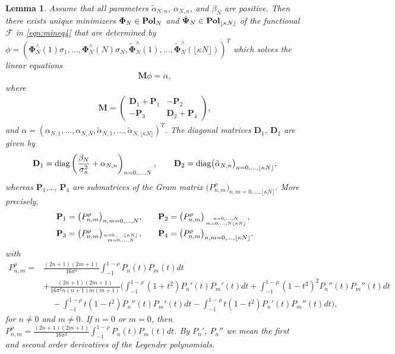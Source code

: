 \documentclass[a4paper, 10pt]{article}
\numberwithin{equation}{section}
\newtheorem{lem}[thm]{Lemma}
\theoremstyle{definition}
\begin{document}
\begin{lem}\label{prop:minsol4}
Assume that all parameters $\tilde{\alpha}_{N,n}$, $\alpha_{N,n}$, and $\beta_N$ are positive. Then there exists unique minimizers $\mathbf{\Phi}_N\in\textnormal{\textbf{Pol}}_{N}$ and $\tilde{\mathbf{\Psi}}_N\in\textnormal{\textbf{Pol}}_{\lfloor\kappa N\rfloor}$ of the functional $\mathcal{F}$ in \eqref{eqn:mineq4} that are determined by $\phi=(\mathbf{\Phi}_N^\wedge(1)\sigma_1,\ldots,\mathbf{\Phi}_N^\wedge(N)\sigma_{N},\tilde{\mathbf{\Phi}}_{N}^\wedge(1),\ldots,\tilde{\mathbf{\Phi}}_{N}^\wedge(\lfloor\kappa N\rfloor))^T$ which solves the linear equations
\begin{align}\label{eqn:lineq4}
\mathbf{M}{\phi}=\alpha,
\end{align}
where 
\begin{align}
\mathbf{M}=\left(\begin{array}{c|c}\mathbf{D}_1+\mathbf{P}_1&-\mathbf{P}_2\\\hline-\mathbf{P}_3&\mathbf{D}_2+\mathbf{P}_4\end{array}\right),
\end{align}
and $\alpha=(\alpha_{N,1},\ldots,\alpha_{N,N},\tilde{\alpha}_{N,1},\ldots,\tilde{\alpha}_{N,\lfloor\kappa N\rfloor})^T$. The diagonal matrices $\mathbf{D}_1$, $\mathbf{D}_2$ are given by 
\begin{align}
\mathbf{D}_1=\textnormal{diag}\left(\frac{\beta_N}{\sigma_n^2}+\alpha_{N,n}\right)_{n=0,\ldots,N}, \qquad\mathbf{D}_2=\textnormal{diag}\big(\tilde{\alpha}_{N,n}\big)_{n=0,\ldots,\lfloor\kappa N\rfloor},
\end{align}
whereas $\mathbf{P}_1$,\ldots, $\mathbf{P}_4$ are submatrices of the Gram matrix $\big(P_{n,m}^\rho\big)_{n,m=0,\ldots, \lfloor\kappa N\rfloor}$. More precisely,
\begin{align}
\mathbf{P}_1=\big(P_{n,m}^\rho\big)_{n,m=0,\ldots,N},&\qquad \mathbf{P}_2=\big(P_{n,m}^\rho\big)_{n=0,\ldots,N\atop m=0,\ldots,N\lfloor\kappa N\rfloor},
\\\mathbf{P}_3=\big(P_{n,m}^\rho\big)_{n=0,\ldots,\lfloor\kappa N\rfloor\atop m=0,\ldots,N},&\qquad\mathbf{P}_4=\big(P_{n,m}^\rho\big)_{n,m=0,\ldots,\lfloor\kappa N\rfloor}.
\end{align}
with
\small\begin{align}
P_{n,m}^\rho=&\frac{(2n+1)(2m+1)}{16\pi^2}\int_{-1}^{1-\rho}P_n\left(t\right)P_m\left(t\right)dt
\\&+\frac{(2n+1)(2m+1)}{16\pi^2n(n+1)m(m+1)}\bigg(\int_{-1}^{1-\rho}(1+t^2)P_n'(t)P_m'(t)dt+\int_{-1}^{1-\rho}(1-t^2)^2P_n''(t)P_m''(t)dt\nonumber
\\&\quad-\int_{-1}^{1-\rho}t(1-t^2)P_n''(t)P_m'(t)dt-\int_{-1}^{1-\rho}t(1-t^2)P_n'(t)P_m''(t)dt\bigg),\nonumber
\end{align}\normalsize
for $n\not=0$ and $m\not=0$. If $n=0$ or $m=0$, then $P_{n,m}^\rho=\frac{(2n+1)(2m+1)}{16\pi^2}\int_{-1}^{1-\rho}P_n\left(t\right)P_m\left(t\right)dt$. By $P_n'$, $P_n''$ we mean the first and second order derivatives of the Legendre polynomials.
\end{lem}
\end{document}
